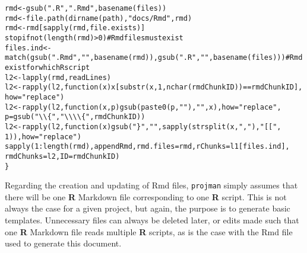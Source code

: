 \documentclass{article}\usepackage[]{graphicx}\usepackage[]{color}
\makeatletter
\newcommand{\hlnum}[1]{\textcolor[rgb]{0.863,0.196,0.184}{#1}}%
\newcommand{\hlstr}[1]{\textcolor[rgb]{0.863,0.196,0.184}{#1}}%
\newcommand{\hlcom}[1]{\textcolor[rgb]{0.345,0.431,0.459}{#1}}%
\newcommand{\hlopt}[1]{\textcolor[rgb]{0.576,0.631,0.631}{#1}}%
\newcommand{\hlstd}[1]{\textcolor[rgb]{0.514,0.58,0.588}{#1}}%
\newcommand{\hlkwa}[1]{\textcolor[rgb]{0.796,0.294,0.086}{#1}}%
\newcommand{\hlkwb}[1]{\textcolor[rgb]{0.522,0.6,0}{#1}}%
\newcommand{\hlkwc}[1]{\textcolor[rgb]{0.796,0.294,0.086}{#1}}%
\newcommand{\hlkwd}[1]{\textcolor[rgb]{0.576,0.631,0.631}{#1}}%
\newenvironment{kframe}{%
 \def\at@end@of@kframe{}%
 \ifinner\ifhmode%
  \def\at@end@of@kframe{\end{minipage}}%
  \begin{minipage}{\columnwidth}%
 \fi\fi%
 \def\FrameCommand##1{\hskip\@totalleftmargin \hskip-\fboxsep
 \colorbox{shadecolor}{##1}\hskip-\fboxsep
     \hskip-\linewidth \hskip-\@totalleftmargin \hskip\columnwidth}%
 \MakeFramed {\advance\hsize-\width
   \@totalleftmargin\z@ \linewidth\hsize
   \@setminipage}}%
 {\par\unskip\endMakeFramed%
 \at@end@of@kframe}
\newenvironment{knitrout}{}{} %
\makeatother
\begin{document}
\begin{knitrout}
\begin{kframe}
\begin{alltt}
    \hlstd{rmd} \hlkwb{<-} \hlkwd{gsub}\hlstd{(}\hlstr{".R"}\hlstd{,} \hlstr{".Rmd"}\hlstd{,} \hlkwd{basename}\hlstd{(files))}
    \hlstd{rmd} \hlkwb{<-} \hlkwd{file.path}\hlstd{(}\hlkwd{dirname}\hlstd{(path),} \hlstr{"docs/Rmd"}\hlstd{, rmd)}
    \hlstd{rmd} \hlkwb{<-} \hlstd{rmd[}\hlkwd{sapply}\hlstd{(rmd, file.exists)]}
    \hlkwd{stopifnot}\hlstd{(}\hlkwd{length}\hlstd{(rmd)} \hlopt{>} \hlnum{0}\hlstd{)}  \hlcom{# Rmd files must exist}
    \hlstd{files.ind} \hlkwb{<-} \hlkwd{match}\hlstd{(}\hlkwd{gsub}\hlstd{(}\hlstr{".Rmd"}\hlstd{,} \hlstr{""}\hlstd{,} \hlkwd{basename}\hlstd{(rmd)),} \hlkwd{gsub}\hlstd{(}\hlstr{".R"}\hlstd{,} \hlstr{""}\hlstd{,} \hlkwd{basename}\hlstd{(files)))}  \hlcom{# Rmd exist for which R script}
    \hlstd{l2} \hlkwb{<-} \hlkwd{lapply}\hlstd{(rmd, readLines)}
    \hlstd{l2} \hlkwb{<-} \hlkwd{rapply}\hlstd{(l2,} \hlkwa{function}\hlstd{(}\hlkwc{x}\hlstd{) x[}\hlkwd{substr}\hlstd{(x,} \hlnum{1}\hlstd{,} \hlkwd{nchar}\hlstd{(rmdChunkID))} \hlopt{==} \hlstd{rmdChunkID],}
        \hlkwc{how} \hlstd{=} \hlstr{"replace"}\hlstd{)}
    \hlstd{l2} \hlkwb{<-} \hlkwd{rapply}\hlstd{(l2,} \hlkwa{function}\hlstd{(}\hlkwc{x}\hlstd{,} \hlkwc{p}\hlstd{)} \hlkwd{gsub}\hlstd{(}\hlkwd{paste0}\hlstd{(p,} \hlstr{" "}\hlstd{),} \hlstr{""}\hlstd{, x),} \hlkwc{how} \hlstd{=} \hlstr{"replace"}\hlstd{,}
        \hlkwc{p} \hlstd{=} \hlkwd{gsub}\hlstd{(}\hlstr{"\textbackslash{}\textbackslash{}\{"}\hlstd{,} \hlstr{"\textbackslash{}\textbackslash{}\textbackslash{}\textbackslash{}\{"}\hlstd{, rmdChunkID))}
    \hlstd{l2} \hlkwb{<-} \hlkwd{rapply}\hlstd{(l2,} \hlkwa{function}\hlstd{(}\hlkwc{x}\hlstd{)} \hlkwd{gsub}\hlstd{(}\hlstr{"\}"}\hlstd{,} \hlstr{""}\hlstd{,} \hlkwd{sapply}\hlstd{(}\hlkwd{strsplit}\hlstd{(x,} \hlstr{","}\hlstd{),} \hlstr{"[["}\hlstd{,}
        \hlnum{1}\hlstd{)),} \hlkwc{how} \hlstd{=} \hlstr{"replace"}\hlstd{)}
    \hlkwd{sapply}\hlstd{(}\hlnum{1}\hlopt{:}\hlkwd{length}\hlstd{(rmd), appendRmd,} \hlkwc{rmd.files} \hlstd{= rmd,} \hlkwc{rChunks} \hlstd{= l1[files.ind],}
        \hlkwc{rmdChunks} \hlstd{= l2,} \hlkwc{ID} \hlstd{= rmdChunkID)}
\hlstd{\}}
\end{alltt}
\end{kframe}
\end{knitrout}

Regarding the creation and updating of Rmd files, \texttt{projman} simply assumes that there will be one \textbf{R} Markdown file corresponding to one \textbf{R} script.
This is not always the case for a given project, but again, the purpose is to generate basic templates.
Unnecessary files can always be deleted later, or edits made such that one \textbf{R} Markdown file reads multiple \textbf{R} scripts,
as is the case with the Rmd file used to generate this document.
\end{document}
